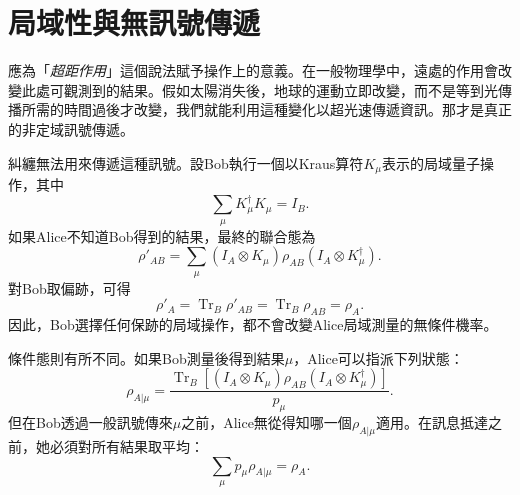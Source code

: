 \section{局域性與無訊號傳遞}

應為「\emph{超距作用}」這個說法賦予操作上的意義。在一般物理學中，遠處的作用會改變此處可觀測到的結果。假如太陽消失後，地球的運動立即改變，而不是等到光傳播所需的時間過後才改變，我們就能利用這種變化以超光速傳遞資訊。那才是真正的非定域訊號傳遞。

糾纏無法用來傳遞這種訊號。設Bob執行一個以Kraus算符\(K_\mu\)表示的局域量子操作，其中
\begin{equation}
\sum_\mu K_\mu^\dagger K_\mu=I_B.
\end{equation}
如果Alice不知道Bob得到的結果，最終的聯合態為
\begin{equation}
\rho'_{AB}
=\sum_\mu
(I_A\otimes K_\mu)\rho_{AB}
(I_A\otimes K_\mu^\dagger).
\end{equation}
對Bob取偏跡，可得
\begin{equation}
\rho'_A
=\operatorname{Tr}_B\rho'_{AB}
=\operatorname{Tr}_B\rho_{AB}
=\rho_A.
\label{eq:l7-no-signaling}
\end{equation}
因此，Bob選擇任何保跡的局域操作，都不會改變Alice局域測量的無條件機率。

條件態則有所不同。如果Bob測量後得到結果\(\mu\)，Alice可以指派下列狀態：
\begin{equation}
\rho_{A|\mu}
=\frac{
\operatorname{Tr}_B\!\left[
(I_A\otimes K_\mu)\rho_{AB}
(I_A\otimes K_\mu^\dagger)
\right]
}{p_\mu}.
\label{eq:l7-conditioned-state}
\end{equation}
但在Bob透過一般訊號傳來\(\mu\)之前，Alice無從得知哪一個\(\rho_{A|\mu}\)適用。在訊息抵達之前，她必須對所有結果取平均：
\begin{equation}
\sum_\mu p_\mu\rho_{A|\mu}=\rho_A.
\label{eq:l7-conditioned-average}
\end{equation}

\begin{classroomqa}
\end{classroomqa}

\begin{classroomqa}
\end{classroomqa}

